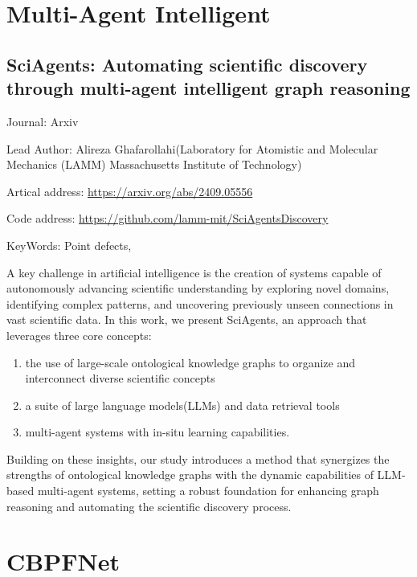 \documentclass[11pt]{elegantbook}
\begin{document}
\section{Multi-Agent Intelligent}
\subsection{SciAgents: Automating scientific discovery through multi-agent intelligent graph reasoning}
\begin{brief}
    \item Journal: Arxiv
    \item Lead Author: Alireza Ghafarollahi(Laboratory for Atomistic and Molecular Mechanics (LAMM) Massachusetts Institute of Technology)
    \item Artical address: \href{https://arxiv.org/abs/2409.05556}{https://arxiv.org/abs/2409.05556}
    \item Code address: \href{https://github.com/lamm-mit/SciAgentsDiscovery}{https://github.com/lamm-mit/SciAgentsDiscovery}
    \item KeyWords: Point defects, 
\end{brief}
A key challenge in artificial intelligence is the creation of systems capable of autonomously advancing scientific understanding by exploring novel domains, identifying complex patterns, and uncovering previously unseen connections in vast scientific data. In this work, we present SciAgents, an approach that leverages three core concepts: 
\begin{enumerate}
    \item the use of large-scale ontological knowledge graphs to organize and interconnect diverse scientific concepts
    \item a suite of large language models(LLMs) and data retrieval tools
    \item multi-agent systems with in-situ learning capabilities.
\end{enumerate}

Building on these insights, our study introduces a method that synergizes the strengths of ontological knowledge graphs with the dynamic capabilities of LLM-based multi-agent systems, setting a robust foundation for enhancing graph reasoning and automating the scientific discovery process.




\section{CBPFNet}
\end{document}
